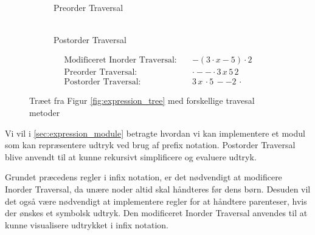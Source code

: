 \documentclass{article}
\begin{document}
\begin{figure}[H]
\begin{subfigure}{0.3\textwidth}
    \caption{\\Preorder Traversal}
  \end{subfigure}
  \hfill
  \begin{subfigure}{0.3\textwidth}
    \centering
    \caption{\\Postorder Traversal}
  \end{subfigure}
  \begin{align*}
      \text{Modificeret Inorder Traversal:} \quad & - (3 \cdot x - 5) \cdot 2 \\
      \text{Preorder Traversal:} \quad &  \cdot - - \cdot 3\, x\, 5\, 2  \\
      \text{Postorder Traversal:} \quad & 3\, x\, \cdot 5\, - -  2\, \cdot
  \end{align*}
  \caption{Træet fra Figur \ref{fig:expression_tree} med forskellige travesal metoder}
  \label{fig:expression_tree_traversal}
\end{figure}


Vi vil i \ref{sec:expression_module} betragte hvordan vi kan implementere et modul som kan repræsentere udtryk ved brug af prefix notation.
Postorder Traversal blive anvendt til at kunne rekursivt simplificere og evaluere udtryk.

Grundet præcedens regler i infix notation, er det nødvendigt at modificere Inorder Traversal, da unære noder altid skal håndteres før dens børn. Desuden vil det også være nødvendigt at implementere regler for at håndtere parenteser, hvis der ønskes et symbolsk udtryk. Den modificeret Inorder Traversal anvendes til at kunne visualisere udtrykket i infix notation.
\end{document}
